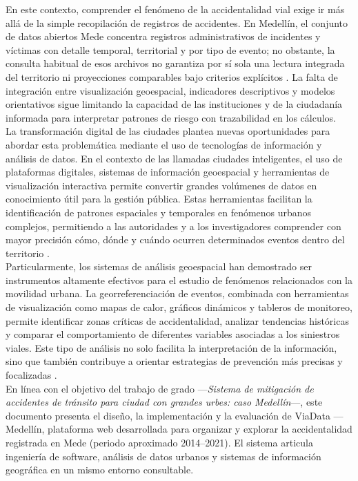 En este contexto, comprender el fenómeno de la accidentalidad vial exige ir más allá de la simple recopilación de registros de accidentes. En Medellín, el conjunto de datos abiertos Mede concentra registros administrativos de incidentes y víctimas con detalle temporal, territorial y por tipo de evento; no obstante, la consulta habitual de esos archivos no garantiza por sí sola una lectura integrada del territorio ni proyecciones comparables bajo criterios explícitos \cite{atancuri2024,castrillon2025}. La falta de integración entre visualización geoespacial, indicadores descriptivos y modelos orientativos sigue limitando la capacidad de las instituciones y de la ciudadanía informada para interpretar patrones de riesgo con trazabilidad en los cálculos.\\
La transformación digital de las ciudades plantea nuevas oportunidades para abordar esta problemática mediante el uso de tecnologías de información y análisis de datos. En el contexto de las llamadas ciudades inteligentes, el uso de plataformas digitales, sistemas de información geoespacial y herramientas de visualización interactiva permite convertir grandes volúmenes de datos en conocimiento útil para la gestión pública. Estas herramientas facilitan la identificación de patrones espaciales y temporales en fenómenos urbanos complejos, permitiendo a las autoridades y a los investigadores comprender con mayor precisión cómo, dónde y cuándo ocurren determinados eventos dentro del territorio \cite{changotasig2023}.\\
Particularmente, los sistemas de análisis geoespacial han demostrado ser instrumentos altamente efectivos para el estudio de fenómenos relacionados con la movilidad urbana. La georreferenciación de eventos, combinada con herramientas de visualización como mapas de calor, gráficos dinámicos y tableros de monitoreo, permite identificar zonas críticas de accidentalidad, analizar tendencias históricas y comparar el comportamiento de diferentes variables asociadas a los siniestros viales. Este tipo de análisis no solo facilita la interpretación de la información, sino que también contribuye a orientar estrategias de prevención más precisas y focalizadas \cite{monar2025}.\\
En línea con el objetivo del trabajo de grado ---\textit{Sistema de mitigación de accidentes de tránsito para ciudad con grandes urbes: caso Medellín}---, este documento presenta el diseño, la implementación y la evaluación de ViaData — Medellín, plataforma web desarrollada para organizar y explorar la accidentalidad registrada en Mede (periodo aproximado 2014--2021). El sistema articula ingeniería de software, análisis de datos urbanos y sistemas de información geográfica en un mismo entorno consultable.

